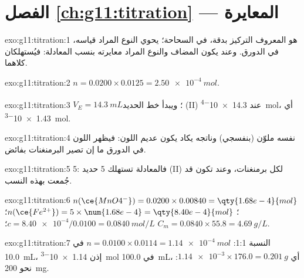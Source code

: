 \section*{الفصل \ref{ch:g11:titration} --- المعايرة}

\begin{solution}{exo:g11:titration:1}
 هو  المعروف التركيز بدقة، في
السحاحة؛  يحوي النوع المراد قياسه، في
الدورق. وعند  يكون  المضاف والنوع المراد معايرته
بنسب المعادلة: فيُستهلكان كلاهما.
\end{solution}

\begin{solution}{exo:g11:titration:2}
$n = 0.0200 \times 0.0125 = \qty{2.50e-4}{mol}$.
\end{solution}

\begin{solution}{exo:g11:titration:3}
$V_E = \qty{14.3}{mL}$؛ ويبدأ خط الحديد (II) عند
\qty{14.3e-4}{mol}، أي \qty{1.43e-3}{mol}.
\end{solution}

\begin{solution}{exo:g11:titration:4}
 نفسه ملوّن (بنفسجي) وناتجه يكاد يكون عديم
اللون: فيظهر اللون في الدورق ما إن تصير البرمنغنات
بفائض.
\end{solution}

\begin{solution}{exo:g11:titration:5}
5: فالمعادلة تستهلك 5  حديد (II) لكل  برمنغنات، وعند
 تكون  قد جُمعت بهذه
النسب.
\end{solution}

\begin{solution}{exo:g11:titration:6}
$n(\ce{MnO4^-}) = 0.0200 \times 0.00840 = \qty{1.68e-4}{mol}$؛
$n(\ce{Fe^{2+}}) = 5 \times \num{1.68e-4} = \qty{8.40e-4}{mol}$؛
$c = \num{8.40e-4} / 0.0100 = \qty{0.0840}{mol/L}$؛
$C_m = 0.0840 \times 55.8 = \qty{4.69}{g/L}$.
\end{solution}

\begin{solution}{exo:g11:titration:7}
النسبة 1:1: $n = 0.0100 \times 0.0114 = \qty{1.14e-4}{mol}$ في
\qty{10.0}{mL}، إذن \qty{1.14e-3}{mol} في \qty{100.0}{mL}، أي
$\num{1.14e-3} \times 176.0 = \qty{0.201}{g}$: نحو \qty{200}{mg}.
\end{solution}

